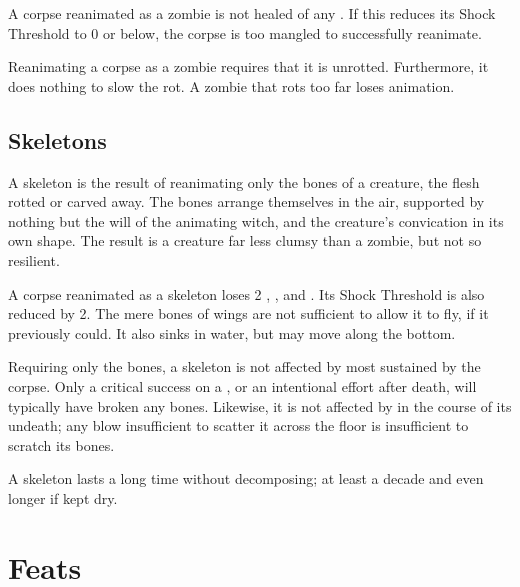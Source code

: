 A corpse reanimated as a zombie is not healed of any .
If this reduces its Shock Threshold to 0 or below, the corpse is too mangled to successfully reanimate.

Reanimating a corpse as a zombie requires that it is unrotted.
Furthermore, it does nothing to slow the rot.
A zombie that rots too far loses animation.

\subsection{Skeletons}

A skeleton is the result of reanimating only the bones of a creature, the flesh rotted or carved away.
The bones arrange themselves in the air, supported by nothing but the will of the animating witch, and the creature's convication in its own shape.
The result is a creature far less clumsy than a zombie, but not so resilient.

A corpse reanimated as a skeleton loses 2 , ,  and .
Its Shock Threshold is also reduced by 2.
The mere bones of wings are not sufficient to allow it to fly, if it previously could.
It also sinks in water, but may move along the bottom.

Requiring only the bones, a skeleton is not affected by most  sustained by the corpse.
Only a critical success on a , or an intentional effort after death, will typically have broken any bones.
Likewise, it is not affected by  in the course of its undeath; any blow insufficient to scatter it across the floor is insufficient to scratch its bones.

A skeleton lasts a long time without decomposing; at least a decade and even longer if kept dry.

\section{Feats}


